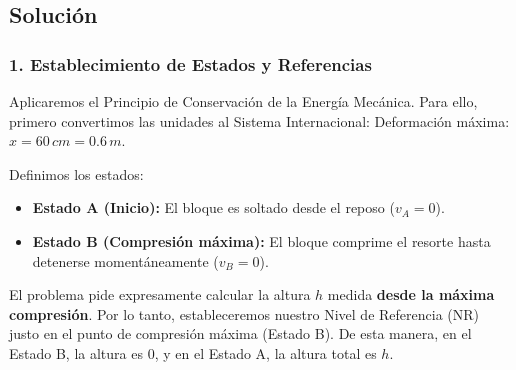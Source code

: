 \documentclass[12pt, a4paper]{article}
\begin{document}
\begin{center}
\end{center}

\subsection*{Solución}

\subsubsection*{1. Establecimiento de Estados y Referencias}
Aplicaremos el Principio de Conservación de la Energía Mecánica. Para ello, primero convertimos las unidades al Sistema Internacional:
Deformación máxima: $x = 60 \, \si{cm} = 0.6 \, \si{m}$.

Definimos los estados:
\begin{itemize}
    \item \textbf{Estado A (Inicio):} El bloque es soltado desde el reposo ($v_A = 0$).
    \item \textbf{Estado B (Compresión máxima):} El bloque comprime el resorte hasta detenerse momentáneamente ($v_B = 0$). 
\end{itemize}

El problema pide expresamente calcular la altura $h$ medida \textbf{desde la máxima compresión}. Por lo tanto, estableceremos nuestro Nivel de Referencia (NR) justo en el punto de compresión máxima (Estado B).
De esta manera, en el Estado B, la altura es $0$, y en el Estado A, la altura total es $h$.
\end{document}
